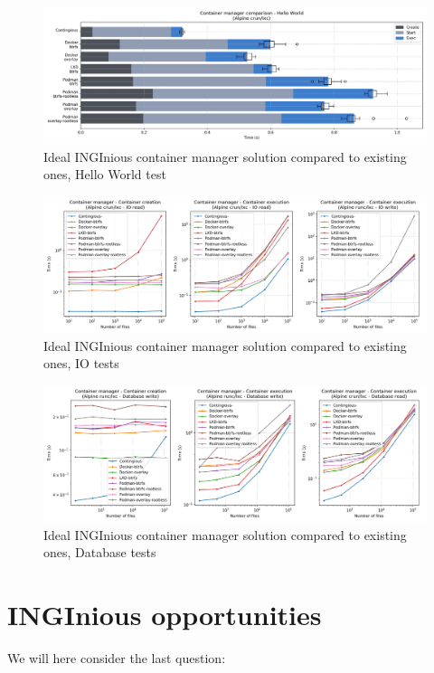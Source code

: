 \begin{figure}[h!]
  \begin{center}
    \includegraphics[width=\linewidth]{images/question-2-hello-world.png}
    \caption{Ideal INGInious container manager solution compared to existing ones, Hello World test}
    \label{fig:q2:hello-world}
  \end{center}
\end{figure}

\begin{figure}[h!]
  \begin{center}
    \includegraphics[width=\linewidth]{images/question-2-io.png}
    \caption{Ideal INGInious container manager solution compared to existing ones, IO tests}
    \label{fig:q2:io}
  \end{center}
\end{figure}

\begin{figure}[h!]
  \begin{center}
    \includegraphics[width=\linewidth]{images/question-2-db.png}
    \caption{Ideal INGInious container manager solution compared to existing ones, Database tests}
    \label{fig:q2:db}
  \end{center}
\end{figure}

\section{INGInious opportunities}
We will here consider the last question:
\begin{center}
\end{center}

